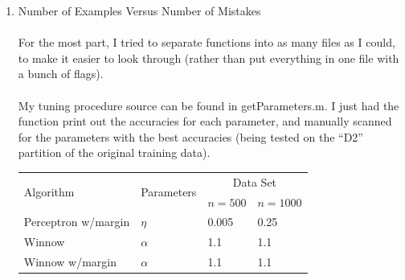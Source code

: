 
\usepackage{amsmath,amssymb,url,color,multirow,array,graphicx,float}
\sloppy
\newcommand{\ignore}[1]{}

\oddsidemargin 0in
\evensidemargin 0in
\textwidth 6.5in
\topmargin -0.5in
\textheight 9.0in




\pagestyle{myheadings}  %

\begin{enumerate}
\item Number of Examples Versus Number of Mistakes\\\\
For the most part, I tried to separate functions into as many files as I could, to make it easier to look through (rather than put everything in one file with a bunch of flags).\\\\
 My tuning procedure source can be found in getParameters.m. I just had the function print out the accuracies for each parameter, and manually scanned for the parameters with the best accuracies (being tested on the ``D2'' partition of the original training data).
\begin{center}
  \begin{table}[!hbp]
    \begin{tabular}{|p{4.3cm}<{\centering}|p{2.5cm}<{\centering}|p{4cm}<{\centering}|p{4cm}<{\centering}|}
      \hline
      \multirow{2}{*}{Algorithm} & \multirow{2}{*}{Parameters} & \multicolumn{2}{|c|}{Data Set} \\
      \cline{3-4}
 & & $n=500$& $n=1000$\\
 \hline
      Perceptron w/margin &          $\eta$          &0.005                   & 0.25                                 \\ \hline
      Winnow               &     $\alpha$           & 1.1                    &1.1                                   \\\hline %
      \multirow{2}{*}{Winnow w/margin}     & $\alpha$& 1.1                                    &  1.1                   \\

\end{tabular}
\end{table}
\end{center}
\end{enumerate}
